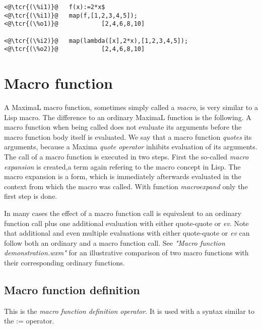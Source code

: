 \documentclass[../Maxima_Workbook.tex]{subfiles}
\begin{document}
\lz \begin{lstlisting}
<@\tcr{(\%i1)}@   f(x):=2*x$
<@\tcr{(\%i1)}@   map(f,[1,2,3,4,5]);
<@\tcr{(\%o1)}@			   [2,4,6,8,10]

<@\tcr{(\%i2)}@   map(lambda([x],2*x),[1,2,3,4,5]); 
<@\tcr{(\%o2)}@			   [2,4,6,8,10]
\end{lstlisting}

\section{Macro function}

A MaximaL macro function, sometimes simply called a \emph{macro}, is very similar to a Lisp macro. The difference to an ordinary MaximaL function is the following. A macro function when being called does not evaluate its arguments before the macro function body itself is evaluated. We say that a macro function \emph{quotes} its arguments, because a Maxima \emph{quote operator} inhibits evaluation of its arguments. The call of a macro function is executed in two steps. First the so-called \emph{macro expansion}  is created,a term again refering to the macro concept in Lisp. The macro expansion is a form, which is immediately afterwards evaluated in the context from which the macro was called. With function \emph{macroexpand} only the first step is done. 

\lz In many cases the effect of a macro function call is equivalent to an ordinary function call plus one additional evaluation with either quote-quote or \emph{ev}. Note that additional and even multiple evaluations with either quote-quote or \emph{ev} can follow both an ordinary and a macro function call. See \emph{"Macro function demonstration.wxm"} for an illustrative comparison of two macro functions with their corresponding ordinary functions.

\subsection{Macro function definition}

\hyt{::=}{\tcr{\emph{::=}}} \hfill {}\index{::=}

\lz This is the \emph{macro function definition operator}. It is used with a syntax similar to the := operator.

\lzz {} \hfill {}
\end{document}
